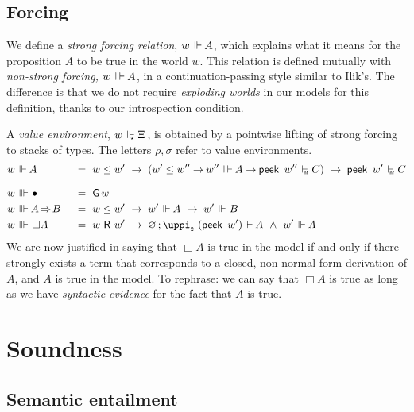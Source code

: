 \documentclass[submission,copyright,creativecommons,sharealike,backref=page]{eptcs}
\newcommand{\Xis}{\rlap{$\Xi$}\hphantom{A}}
\newcommand{\sA}{\mkern-2muA}
\newcommand{\R}{\mathrel{\rlap{$\mkern.75mu\textsf{R}$}\hphantom{\subseteq}}}
\renewcommand{\:}{\mathop{\mkern3mu:\mkern3mu}}
\renewcommand{\.}{\mathop{\mkern3mu.\mkern3mu}}
\renewcommand{\;}{\mathop{;}}
\renewcommand{\,}{\mathop{,}}
\newcommand{\conj}{\mathrel{\wedge}}
\newcommand{\e}{\mathrel{\mkern2mu\vdash\mkern1mu}}
\newcommand{\enf}{\mathrel{\mkern2mu\vdash_{\mkern-9mu\scriptscriptstyle{\textsf{nf}}}}}
\newcommand{\ee}{\mathrel{\mkern2mu\Vdash\mkern1mu}}
\newcommand{\ees}{\mathrel{\mkern2mu\Vdash_{\mkern-9mu\scriptscriptstyle{\star}}}}
\newcommand{\eee}{\mathrel{\mkern2mu\Vvdash\mkern1mu}}
\renewcommand{\r}{\mathrel{\rightarrow\mkern-1mu}}
\newcommand{\rf}{\mathop{\Rightarrow\mkern-1mu}}
\newcommand{\peek}{\operatorname{\textsf{peek}}}
\newcommand{\piii}{\operatorname{\uppi_{\scriptscriptstyle{2}}}}
\newcommand{\G}{\operatorname{\textsf{G}}}
\newcommand{\base}{\mathop{\bullet}}
\renewcommand{\O}{\varnothing}
\theoremstyle{mystyle}
\begin{document}
\subsection{Forcing}

We define a \emph{strong forcing relation}, $w \ee \sA$, which explains what it means for the proposition $A$ to be true in the world $w$.  This relation is defined mutually with \emph{non-strong forcing,} $w \eee \sA$, in a continuation-passing style similar to Ilik's.  The difference is that we do not require \emph{exploding worlds} in our models for this definition, thanks to our introspection condition.

A \emph{value environment}, $w \ees \Xis$, is obtained by a pointwise lifting of strong forcing to stacks of types.  The letters $\rho, \sigma$ refer to value environments.
\begin{alignat*}{2}
  & w \ee \sA        && ~=~ w \le w' ~\r~ (w' \le w'' \r w'' \eee \sA \r \peek~w'' \enf C) ~\r~ \peek~w' \enf C\\[.5\baselineskip]
  & w \eee \base     && ~=~ \G w\\
  & w \eee \sA \rf B && ~=~ w \le w' ~\r~ w' \ee \sA ~\r~ w' \ee B\\
  & w \eee \Box A    && ~=~ w \R w' ~\r~ \O \; \piii~(\peek~w') \e \sA~\conj~w' \ee \sA
\end{alignat*}
We are now justified in saying that $\Box A$ is true in the model if and only if there strongly exists a term that corresponds to a closed, non-normal form derivation of $A$, and $A$ is true in the model.  To rephrase: we can say that $\Box A$ is true as long as we have \emph{syntactic evidence} for the fact that $A$ is true.


\section{Soundness}\label{Soundness}

\subsection{Semantic entailment}
\end{document}
